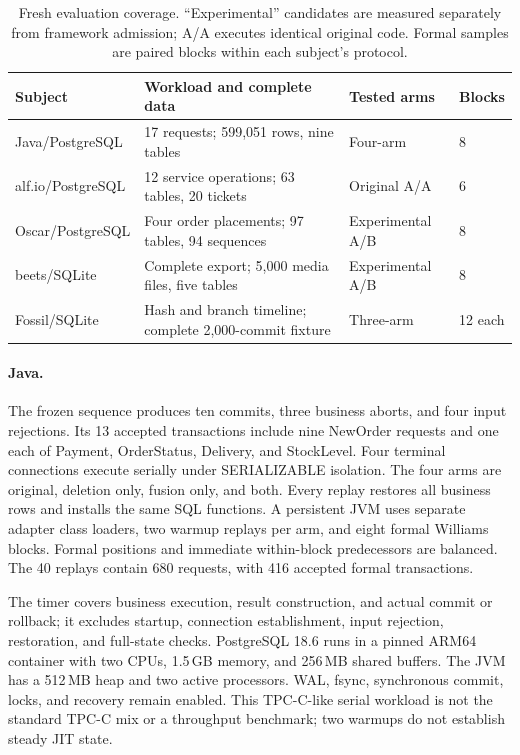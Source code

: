 \documentclass[acmsmall,screen,review,anonymous]{acmart}
\begin{document}
\begin{table}[t]
\caption{Fresh evaluation coverage. ``Experimental'' candidates are measured
separately from framework admission; A/A executes identical original code.
Formal samples are paired blocks within each subject's protocol.}
\label{tab:coverage}
\small
\begin{tabularx}{\linewidth}{@{}lXll@{}}
\toprule
Subject & Workload and complete data & Tested arms & Blocks \\
\midrule
Java/PostgreSQL & 17 requests; 599,051 rows, nine tables & Four-arm & 8 \\
alf.io/PostgreSQL & 12 service operations; 63 tables, 20 tickets & Original A/A & 6 \\
Oscar/PostgreSQL & Four order placements; 97 tables, 94 sequences & Experimental A/B & 8 \\
beets/SQLite & Complete export; 5,000 media files, five tables & Experimental A/B & 8 \\
Fossil/SQLite & Hash and branch timeline; complete 2,000-commit fixture & Three-arm & 12 each \\
\bottomrule
\end{tabularx}
\end{table}

\paragraph{Java.}
The frozen sequence produces ten commits, three business aborts, and four input
rejections. Its 13 accepted transactions include nine NewOrder requests and one
each of Payment, OrderStatus, Delivery, and StockLevel. Four terminal connections
execute serially under SERIALIZABLE isolation. The four arms are original,
deletion only, fusion only, and both. Every replay restores all business rows
and installs the same SQL functions. A persistent JVM uses separate adapter
class loaders, two warmup replays per arm, and eight formal Williams blocks.
Formal positions and immediate within-block predecessors are balanced.
The 40 replays contain 680 requests, with 416 accepted formal transactions.

The timer covers business execution, result construction, and actual commit or
rollback; it excludes startup, connection establishment, input rejection,
restoration, and full-state checks. PostgreSQL 18.6 runs in a pinned ARM64
container with two CPUs, 1.5\,GB memory, and 256\,MB shared buffers. The JVM has
a 512\,MB heap and two active processors. WAL, fsync, synchronous commit, locks,
and recovery remain enabled. This TPC-C-like serial workload is not the standard
TPC-C mix or a throughput benchmark; two warmups do not establish steady JIT state.
\end{document}
